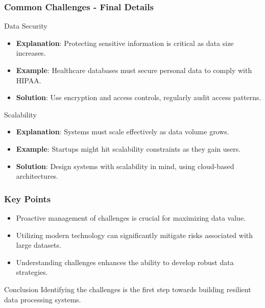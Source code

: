 \documentclass[aspectratio=169]{beamer}
\begin{document}
\begin{frame}[fragile]
    \frametitle{Common Challenges - Final Details}
    \begin{block}{Data Security}
        \begin{itemize}
            \item \textbf{Explanation}: Protecting sensitive information is critical as data size increases.
            \item \textbf{Example}: Healthcare databases must secure personal data to comply with HIPAA.
            \item \textbf{Solution}: Use encryption and access controls, regularly audit access patterns.
        \end{itemize}
    \end{block}

    \begin{block}{Scalability}
        \begin{itemize}
            \item \textbf{Explanation}: Systems must scale effectively as data volume grows.
            \item \textbf{Example}: Startups might hit scalability constraints as they gain users.
            \item \textbf{Solution}: Design systems with scalability in mind, using cloud-based architectures.
        \end{itemize}
    \end{block}
\end{frame}

\begin{frame}[fragile]
    \frametitle{Key Points}
    \begin{itemize}
        \item Proactive management of challenges is crucial for maximizing data value.
        \item Utilizing modern technology can significantly mitigate risks associated with large datasets.
        \item Understanding challenges enhances the ability to develop robust data strategies.
    \end{itemize}
    
    \begin{block}{Conclusion}
        Identifying the challenges is the first step towards building resilient data processing systems.
    \end{block}
\end{frame}
\end{document}
